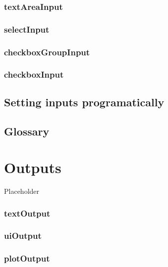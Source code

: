 \documentclass[
]{book}
\begin{document}
\hypertarget{textareainput}{%
\subsection{textAreaInput}\label{textareainput}}

\hypertarget{selectinput}{%
\subsection{selectInput}\label{selectinput}}

\hypertarget{checkboxgroupinput}{%
\subsection{checkboxGroupInput}\label{checkboxgroupinput}}

\hypertarget{checkboxinput}{%
\subsection{checkboxInput}\label{checkboxinput}}

\hypertarget{setting-inputs-programatically}{%
\section{Setting inputs programatically}\label{setting-inputs-programatically}}

\hypertarget{glossary-inputs}{%
\section{Glossary}\label{glossary-inputs}}

\hypertarget{outputa}{%
\chapter{Outputs}\label{outputa}}

Placeholder

\hypertarget{textoutput}{%
\subsection{textOutput}\label{textoutput}}

\hypertarget{uioutput}{%
\subsection{uiOutput}\label{uioutput}}

\hypertarget{plotoutput}{%
\subsection{plotOutput}\label{plotoutput}}
\end{document}

